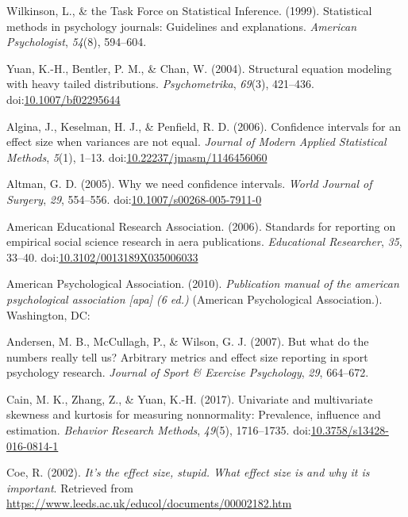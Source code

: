 \documentclass[
  man,floatsintext]{apa6}
\begin{document}
\leavevmode\hypertarget{ref-Wilkinson_1999}{}%
Wilkinson, L., \& the Task Force on Statistical Inference. (1999). Statistical methods in psychology journals: Guidelines and explanations. \emph{American Psychologist}, \emph{54}(8), 594--604.

\leavevmode\hypertarget{ref-Yuan_et_al_2004}{}%
Yuan, K.-H., Bentler, P. M., \& Chan, W. (2004). Structural equation modeling with heavy tailed distributions. \emph{Psychometrika}, \emph{69}(3), 421--436. doi:\href{https://doi.org/10.1007/bf02295644}{10.1007/bf02295644}

\leavevmode\hypertarget{ref-Algina_et_al_2006}{}%
Algina, J., Keselman, H. J., \& Penfield, R. D. (2006). Confidence intervals for an effect size when variances are not equal. \emph{Journal of Modern Applied Statistical Methods}, \emph{5}(1), 1--13. doi:\href{https://doi.org/10.22237/jmasm/1146456060}{10.22237/jmasm/1146456060}

\leavevmode\hypertarget{ref-Altman_2005}{}%
Altman, G. D. (2005). Why we need confidence intervals. \emph{World Journal of Surgery}, \emph{29}, 554--556. doi:\href{https://doi.org/10.1007/s00268-005-7911-0}{10.1007/s00268-005-7911-0}

\leavevmode\hypertarget{ref-AERA_2006}{}%
American Educational Research Association. (2006). Standards for reporting on empirical social science research in aera publications. \emph{Educational Researcher}, \emph{35}, 33--40. doi:\href{https://doi.org/10.3102/0013189X035006033}{10.3102/0013189X035006033}

\leavevmode\hypertarget{ref-APA_2010}{}%
American Psychological Association. (2010). \emph{Publication manual of the american psychological association {[}apa{]} (6 ed.)} (American Psychological Association.). Washington, DC:

\leavevmode\hypertarget{ref-Andersen_et_al_2007}{}%
Andersen, M. B., McCullagh, P., \& Wilson, G. J. (2007). But what do the numbers really tell us? Arbitrary metrics and effect size reporting in sport psychology research. \emph{Journal of Sport \& Exercise Psychology}, \emph{29}, 664--672.

\leavevmode\hypertarget{ref-Cain_et_al_2017}{}%
Cain, M. K., Zhang, Z., \& Yuan, K.-H. (2017). Univariate and multivariate skewness and kurtosis for measuring nonnormality: Prevalence, influence and estimation. \emph{Behavior Research Methods}, \emph{49}(5), 1716--1735. doi:\href{https://doi.org/10.3758/s13428-016-0814-1}{10.3758/s13428-016-0814-1}

\leavevmode\hypertarget{ref-Coe_2002}{}%
Coe, R. (2002). \emph{It's the effect size, stupid. What effect size is and why it is important}. Retrieved from \url{https://www.leeds.ac.uk/educol/documents/00002182.htm}
\end{document}

